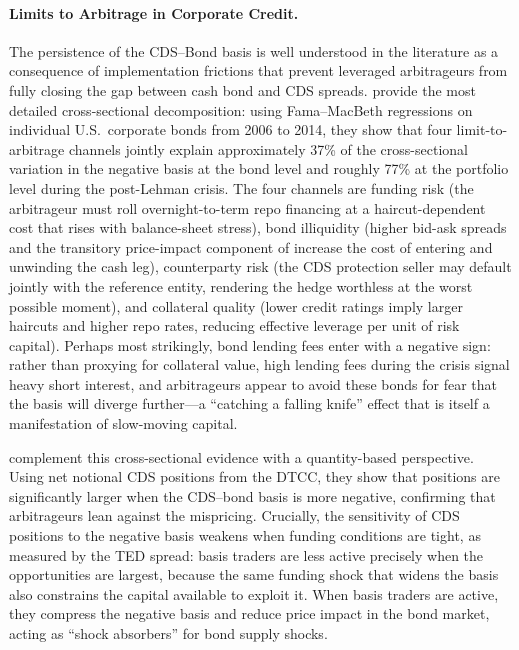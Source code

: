 \paragraph{Limits to Arbitrage in Corporate Credit.}
The persistence of the CDS--Bond basis is well understood in the literature as
a consequence of implementation frictions that prevent leveraged arbitrageurs
from fully closing the gap between cash bond and CDS spreads.
\citet{bai2019cds} provide the most detailed cross-sectional
decomposition: using Fama--MacBeth regressions on individual U.S.\ corporate
bonds from 2006 to 2014, they show that four limit-to-arbitrage channels
jointly explain approximately 37\% of the cross-sectional variation in the
negative basis at the bond level and roughly 77\% at the portfolio level during
the post-Lehman crisis.  The four channels are funding risk (the arbitrageur
must roll overnight-to-term repo financing at a haircut-dependent cost that
rises with balance-sheet stress), bond illiquidity (higher bid-ask spreads and
the transitory price-impact component of \citet{bao2011illiquidity} increase the
cost of entering and unwinding the cash leg), counterparty risk (the CDS
protection seller may default jointly with the reference entity, rendering the
hedge worthless at the worst possible moment), and collateral quality (lower
credit ratings imply larger haircuts and higher repo rates, reducing effective
leverage per unit of risk capital).  Perhaps most strikingly, bond lending fees
enter with a negative sign: rather than proxying for collateral value, high
lending fees during the crisis signal heavy short interest, and arbitrageurs
appear to avoid these bonds for fear that the basis will diverge further---a
``catching a falling knife'' effect that is itself a manifestation of
slow-moving capital.

\citet{oehmke2017anatomy} complement this cross-sectional evidence with a
quantity-based perspective.  Using net notional CDS positions from the DTCC,
they show that positions are significantly larger when the CDS--bond basis is
more negative, confirming that arbitrageurs lean against the mispricing.
Crucially, the sensitivity of CDS positions to the negative basis weakens when
funding conditions are tight, as measured by the TED spread: basis traders are
less active precisely when the opportunities are largest, because the same
funding shock that widens the basis also constrains the capital available to
exploit it.  When basis traders are active, they compress the negative basis and
reduce price impact in the bond market, acting as ``shock absorbers'' for bond
supply shocks.

